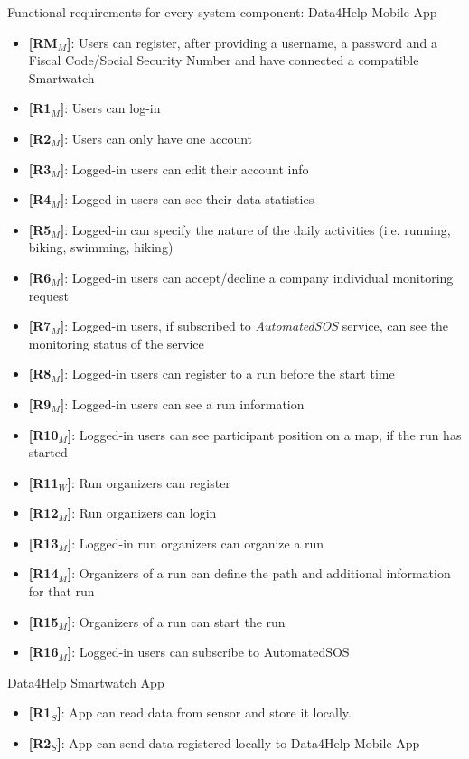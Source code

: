 Functional requirements for every system component:
\newline
Data4Help Mobile App
\begin{itemize}
    \item \textbf{[RM$_M$]}: Users can register, after providing a username, a password and a Fiscal Code/Social Security Number and have connected a compatible Smartwatch
    \item \textbf{[R1$_M$]}: Users can log-in
    \item \textbf{[R2$_M$]}: Users can only have one account 
    \item \textbf{[R3$_M$]}: Logged-in users can edit their account info
    \item \textbf{[R4$_M$]}: Logged-in users can see their data statistics
    \item \textbf{[R5$_M$]}: Logged-in can specify the nature of the daily activities (i.e. running, biking, swimming, hiking)
    \item \textbf{[R6$_M$]}: Logged-in users can accept/decline a company individual monitoring request
    \item \textbf{[R7$_M$]}: Logged-in users, if subscribed to \textit{AutomatedSOS} service, can see the monitoring status of the service
    
    \item \textbf{[R8$_M$]}: Logged-in users can register to a run before the start time
    \item \textbf{[R9$_M$]}: Logged-in users can see a run information
    \item \textbf{[R10$_M$]}: Logged-in users can see participant position on a map, if the run has started
        \item \textbf{[R11$_W$]}: Run organizers can register
    \item \textbf{[R12$_M$]}: Run organizers can login
    \item \textbf{[R13$_M$]}: Logged-in run organizers can organize a run
    \item \textbf{[R14$_M$]}: Organizers of a run can define the path and additional information for that run
    \item \textbf{[R15$_M$]}: Organizers of a run can start the run
    \item \textbf{[R16$_M$]}: Logged-in users can subscribe to AutomatedSOS
\end{itemize}

\noindent Data4Help Smartwatch App
\begin{itemize}
    \item \textbf{[R1$_S$]}: App can read data from sensor and store it locally.
    \item \textbf{[R2$_S$]}: App can send data registered locally to Data4Help Mobile App
\end{itemize}

